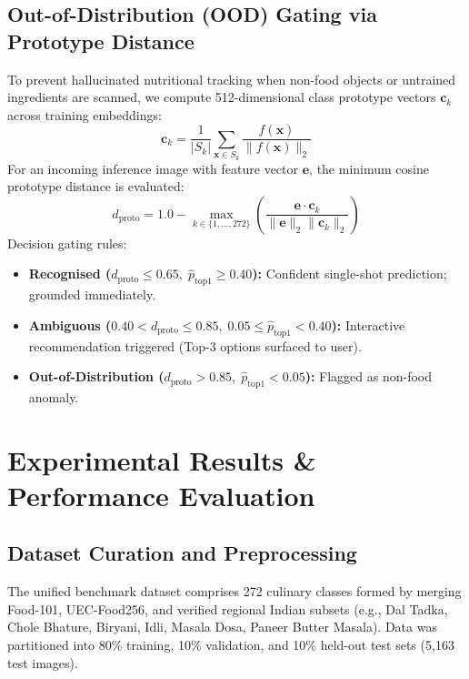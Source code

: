\documentclass[conference]{IEEEtran}
\begin{document}
\subsection{Out-of-Distribution (OOD) Gating via Prototype Distance}
To prevent hallucinated nutritional tracking when non-food objects or untrained ingredients are scanned, we compute 512-dimensional class prototype vectors $\mathbf{c}_k$ across training embeddings:
\begin{equation}
\mathbf{c}_k = \frac{1}{|S_k|} \sum_{\mathbf{x} \in S_k} \frac{f(\mathbf{x})}{\|f(\mathbf{x})\|_2}
\end{equation}
For an incoming inference image with feature vector $\mathbf{e}$, the minimum cosine prototype distance is evaluated:
\begin{equation}
d_{\text{proto}} = 1.0 - \max_{k \in \{1,\dots,272\}} \left( \frac{\mathbf{e} \cdot \mathbf{c}_k}{\|\mathbf{e}\|_2 \|\mathbf{c}_k\|_2} \right)
\end{equation}
Decision gating rules:
\begin{itemize}
    \item \textbf{Recognised ($d_{\text{proto}} \le 0.65, \; \hat{p}_{\text{top1}} \ge 0.40$):} Confident single-shot prediction; grounded immediately.
    \item \textbf{Ambiguous ($0.40 < d_{\text{proto}} \le 0.85, \; 0.05 \le \hat{p}_{\text{top1}} < 0.40$):} Interactive recommendation triggered (Top-3 options surfaced to user).
    \item \textbf{Out-of-Distribution ($d_{\text{proto}} > 0.85, \; \hat{p}_{\text{top1}} < 0.05$):} Flagged as non-food anomaly.
\end{itemize}

\section{Experimental Results \& Performance Evaluation}

\subsection{Dataset Curation and Preprocessing}
The unified benchmark dataset comprises 272 culinary classes formed by merging Food-101, UEC-Food256, and verified regional Indian subsets (e.g., Dal Tadka, Chole Bhature, Biryani, Idli, Masala Dosa, Paneer Butter Masala). Data was partitioned into 80\% training, 10\% validation, and 10\% held-out test sets (5,163 test images).
\end{document}
